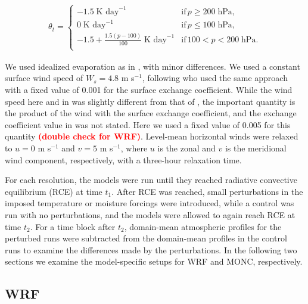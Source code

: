 \documentclass[draft]{agujournal2019}
\newcommand{\todo}[1]{\textcolor{red}{\textbf{(#1)}}}
\begin{document}
\begin{align}
 \theta_t = \begin{cases}
    -1.5\; \textrm{K day}^{-1} & \textrm{if}\, p \geq 200\; \textrm{hPa}, \\
    0\; \textrm{K day}^{-1} & \textrm{if}\, p \leq 100\; \textrm{hPa}, \\
    -1.5 + \frac{1.5 (p-100)}{100}\; \textrm{K day}^{-1} & \textrm{if}\, 100 < p < 200\; \textrm{hPa}. \\
 \end{cases}
\end{align}

We used idealized evaporation as in , with minor
differences. We used a constant surface wind speed of $W_s = 4.8$ m s$^{-1}$,
following  who used the same approach with a fixed value
of 0.001 for the surface exchange coefficient. While the wind speed here and in
 was slightly different from that of
, the important quantity is the product of the wind with
the surface exchange coefficient, and the exchange coefficient value in
 was not stated. Here we used a fixed value of 0.005 for
this quantity \todo{double check for WRF}. Level-mean horizontal winds
were relaxed to $u = 0$ m s$^{-1}$ and $v = 5$ m s$^{-1}$, where $u$ is the
zonal and $v$ is the meridional wind component, respectively, with a three-hour
relaxation time.

For each resolution, the models were run until they reached radiative convective
equilibrium (RCE) at time $t_1$. After RCE was reached, small perturbations in
the imposed temperature or moisture forcings were introduced, while a control
was run with no perturbations, and the models were allowed to again reach RCE at
time $t_2$. For a time block after $t_2$, domain-mean atmospheric profiles for
the perturbed runs were subtracted from the domain-mean profiles in the control
runs to examine the differences made by the perturbations. In the following two
sections we examine the model-specific setups for WRF and MONC, respectively.

\subsection{WRF}
\end{document}
